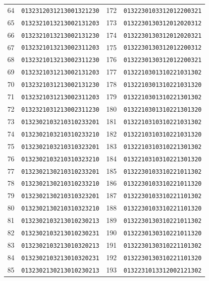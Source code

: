 \documentclass[aps,pra,reprint,superscriptaddress,longbibliography,nofootinbib,floatfix,10pt]{revtex4-2}
\theoremstyle{definition}
\begin{document}
\begin{longtable}{rl@{\qquad}rl}
64 & \texttt{0132312031213001321230} & 172 & \texttt{0132230103312012200321}\\
65 & \texttt{0132321013213002131203} & 173 & \texttt{0132230130312012020312}\\
66 & \texttt{0132321013213002131230} & 174 & \texttt{0132230130312012020321}\\
67 & \texttt{0132321013213002311203} & 175 & \texttt{0132230130312012200312}\\
68 & \texttt{0132321013213002311230} & 176 & \texttt{0132230130312012200321}\\
69 & \texttt{0132321031213002131203} & 177 & \texttt{0132210301310221031302}\\
70 & \texttt{0132321031213002131230} & 178 & \texttt{0132210301310221031320}\\
71 & \texttt{0132321031213002311203} & 179 & \texttt{0132210301310221301302}\\
72 & \texttt{0132321031213002311230} & 180 & \texttt{0132210301310221301320}\\
73 & \texttt{0132302103210310233201} & 181 & \texttt{0132210310310221031302}\\
74 & \texttt{0132302103210310233210} & 182 & \texttt{0132210310310221031320}\\
75 & \texttt{0132302103210310323201} & 183 & \texttt{0132210310310221301302}\\
76 & \texttt{0132302103210310323210} & 184 & \texttt{0132210310310221301320}\\
77 & \texttt{0132302130210310233201} & 185 & \texttt{0132230103310221011302}\\
78 & \texttt{0132302130210310233210} & 186 & \texttt{0132230103310221011320}\\
79 & \texttt{0132302130210310323201} & 187 & \texttt{0132230103310221101302}\\
80 & \texttt{0132302130210310323210} & 188 & \texttt{0132230103310221101320}\\
81 & \texttt{0132302103213010230213} & 189 & \texttt{0132230130310221011302}\\
82 & \texttt{0132302103213010230231} & 190 & \texttt{0132230130310221011320}\\
83 & \texttt{0132302103213010320213} & 191 & \texttt{0132230130310221101302}\\
84 & \texttt{0132302103213010320231} & 192 & \texttt{0132230130310221101320}\\
85 & \texttt{0132302130213010230213} & 193 & \texttt{0132231013312002121302}\\

\end{longtable}
\end{document}
